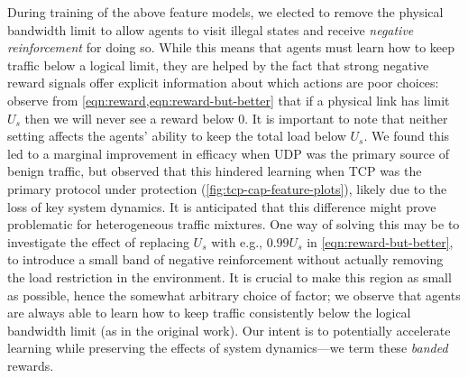 \documentclass[conference, a4paper, 10pt, times]{IEEEtran}
\begin{document}
During training of the above feature models, we elected to remove the physical bandwidth limit to allow agents to visit illegal states and receive \emph{negative reinforcement} for doing so.
While this means that agents must learn how to keep traffic below a logical limit, they are helped by the fact that strong negative reward signals offer explicit information about which actions are poor choices: observe from \cref{eqn:reward,eqn:reward-but-better} that if a physical link has limit $U_s$ then we will never see a reward below 0.
It is important to note that neither setting affects the agents' ability to keep the total load below $U_s$.
We found this led to a marginal improvement in efficacy when UDP was the primary source of benign traffic, but observed that this hindered learning when TCP was the primary protocol under protection (\cref{fig:tcp-cap-feature-plots}), likely due to the loss of key system dynamics.
It is anticipated that this difference might prove problematic for heterogeneous traffic mixtures.
One way of solving this may be to investigate the effect of replacing $U_s$ with e.g., $0.99 U_s$ in \cref{eqn:reward-but-better}, to introduce a small band of negative reinforcement without actually removing the load restriction in the environment.
It is crucial to make this region as small as possible, hence the somewhat arbitrary choice of factor; we observe that agents are always able to learn how to keep traffic consistently below the logical bandwidth limit (as in the original work).
Our intent is to potentially accelerate learning while preserving the effects of system dynamics---we term these \emph{banded} rewards.


\end{document}
